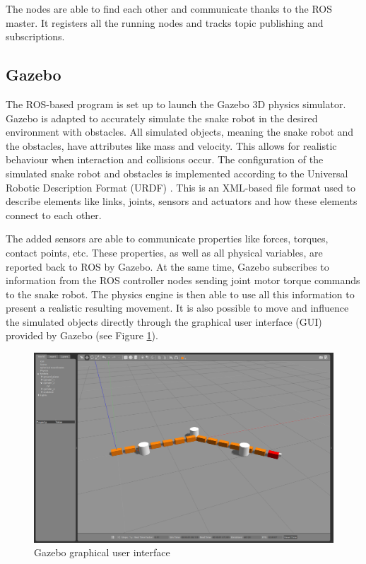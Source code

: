 The nodes are able to find each other and communicate thanks to the ROS master. It registers all the 
running nodes and tracks topic publishing and subscriptions.

\subsection{Gazebo}

The ROS-based program is set up to launch the Gazebo 3D physics simulator. Gazebo is adapted to accurately simulate the snake robot in the desired environment with obstacles. All simulated objects, meaning the snake robot and the obstacles, have attributes like mass and velocity. This allows for realistic behaviour when interaction and collisions occur. The configuration of the simulated snake robot and obstacles is implemented according to the Universal Robotic Description Format (URDF) \cite{urdfWeb}. This is an XML-based file format used to describe elements like links, joints, sensors and actuators and how these elements connect to each other.

The added sensors are able to communicate properties like forces, torques, contact points, etc. These properties, as well as all physical variables, are reported back to ROS by Gazebo.
At the same time, Gazebo subscribes to information from the ROS controller nodes sending joint motor torque commands to the snake robot. The physics engine is then able to use all this information to present a realistic resulting movement. It is also possible to move and influence the simulated objects directly through the graphical user interface (GUI) provided by Gazebo (see Figure \ref{fig:gazebo_gui}).

\begin{figure}[h!]
    \centering
    \includegraphics[width=1\textwidth]{figures/simulator/gazebo_gen_screen.png}
    \caption{Gazebo graphical user interface}
    \label{fig:gazebo_gui}
\end{figure}